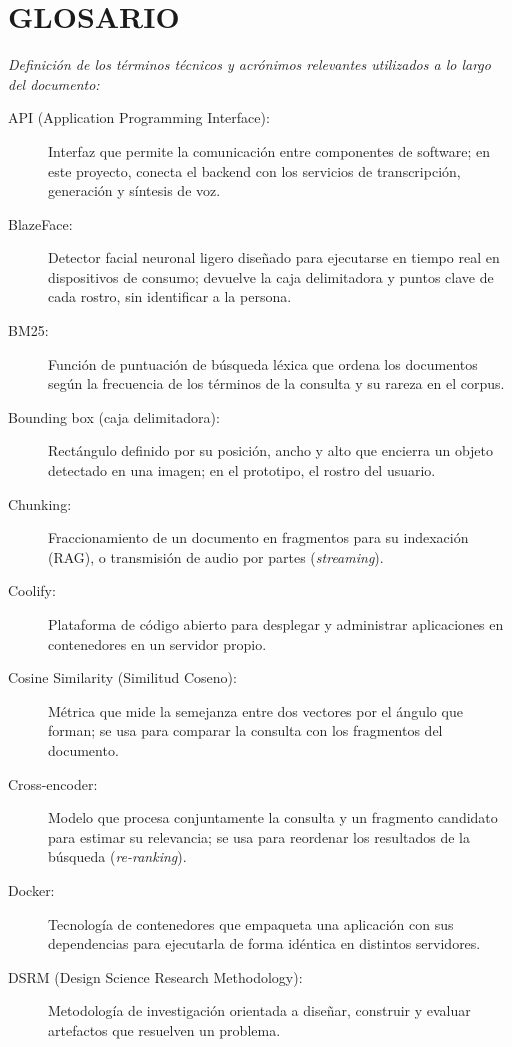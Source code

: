 \clearpage
\chapter*{GLOSARIO}

\noindent\textit{Definición de los términos técnicos y acrónimos relevantes utilizados a lo largo del documento:}

\begin{description}
  \item[API (Application Programming Interface):] Interfaz que permite la comunicación entre componentes de software; en este proyecto, conecta el backend con los servicios de transcripción, generación y síntesis de voz.
  \item[BlazeFace:] Detector facial neuronal ligero diseñado para ejecutarse en tiempo real en dispositivos de consumo; devuelve la caja delimitadora y puntos clave de cada rostro, sin identificar a la persona.
  \item[BM25:] Función de puntuación de búsqueda léxica que ordena los documentos según la frecuencia de los términos de la consulta y su rareza en el corpus.
  \item[Bounding box (caja delimitadora):] Rectángulo definido por su posición, ancho y alto que encierra un objeto detectado en una imagen; en el prototipo, el rostro del usuario.
  \item[Chunking:] Fraccionamiento de un documento en fragmentos para su indexación (RAG), o transmisión de audio por partes (\textit{streaming}).
  \item[Coolify:] Plataforma de código abierto para desplegar y administrar aplicaciones en contenedores en un servidor propio.
  \item[Cosine Similarity (Similitud Coseno):] Métrica que mide la semejanza entre dos vectores por el ángulo que forman; se usa para comparar la consulta con los fragmentos del documento.
  \item[Cross-encoder:] Modelo que procesa conjuntamente la consulta y un fragmento candidato para estimar su relevancia; se usa para reordenar los resultados de la búsqueda (\textit{re-ranking}).
  \item[Docker:] Tecnología de contenedores que empaqueta una aplicación con sus dependencias para ejecutarla de forma idéntica en distintos servidores.
  \item[DSRM (Design Science Research Methodology):] Metodología de investigación orientada a diseñar, construir y evaluar artefactos que resuelven un problema.

\end{description}
